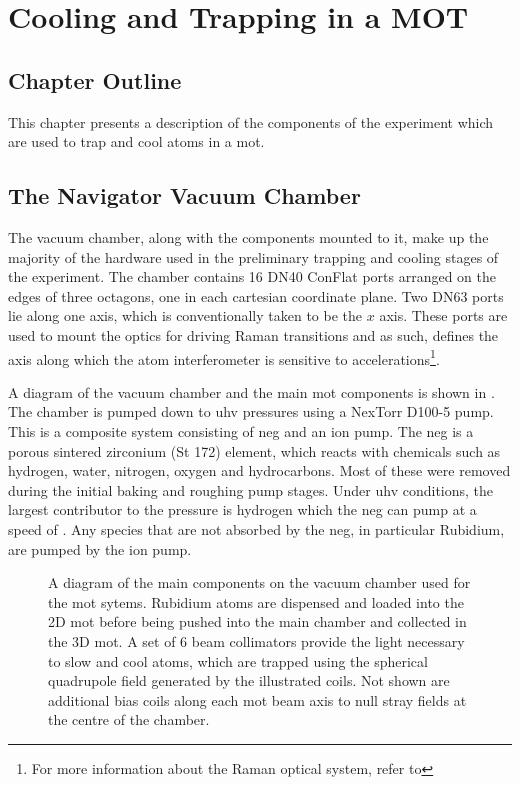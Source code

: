 \chapter{Cooling and Trapping in a MOT}
\section{Chapter Outline}
This chapter presents a description of the components of the experiment which are used to trap and cool atoms in a \ac{mot}. 
\section{The Navigator Vacuum Chamber}\label{sec:vacuum_chamber}
The vacuum chamber, along with the components mounted to it, make up the majority of the hardware used in the preliminary trapping and cooling stages of the experiment. The chamber contains 16 DN40 ConFlat ports arranged on the edges of three octagons, one in each cartesian coordinate plane. Two DN63 ports lie along one axis, which is conventionally taken to be the \(x\) axis. These ports are used to mount the optics for driving Raman transitions and as such, defines the axis along which the atom interferometer is sensitive to accelerations\footnote{For more information about the Raman optical system, refer to }. \par\noindent
A diagram of the vacuum chamber and the main \ac{mot} components is shown in . The chamber is pumped down to \ac{uhv} pressures using a NexTorr D100-5 pump. This is a composite system consisting of \ac{neg} and an ion pump. The \ac{neg} is a porous sintered zirconium (St 172) element, which reacts with chemicals such as hydrogen, water, nitrogen, oxygen and hydrocarbons. Most of these were removed during the initial baking and roughing pump stages. Under \ac{uhv} conditions, the largest contributor to the pressure is hydrogen which the \ac{neg} can pump at a speed of . Any species that are not absorbed by the \ac{neg}, in particular Rubidium, are pumped by the  ion pump.
\begin{figure}
    \centering
    \def\svgwidth{1\textwidth}
    
    \caption[\ac{mot} system component diagram]{A diagram of the main components on the vacuum chamber used for the \ac{mot} sytems. Rubidium atoms are dispensed and loaded into the 2D \ac{mot} before being pushed into the main chamber and collected in the 3D \ac{mot}. A set of 6 beam collimators provide the light necessary to slow and cool atoms, which are trapped using the spherical quadrupole field generated by the illustrated coils. Not shown are additional bias coils along each \ac{mot} beam axis to null stray fields at the centre of the chamber.}
    \label{fig:mot_system}
\end{figure}   

